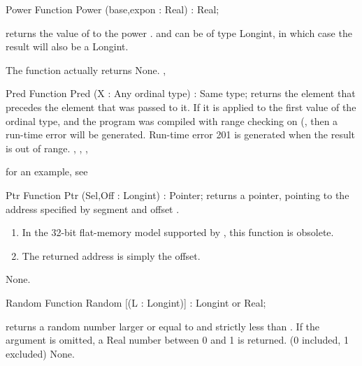 \begin{function}{Power}
\Declaration
Function Power (base,expon : Real) : Real;
\Description

 returns the value of  to the power .
 and  can be of type Longint, in which case the
result will also be a Longint.

The function actually returns 
\Errors
None.
\SeeAlso
{}, 
\end{function}


\begin{function}{Pred}
\Declaration
Function Pred (X : Any ordinal type) : Same type;
\Description
  returns the element that precedes the element that was passed
to it. If it is applied to the first value of the ordinal type, and the
program was compiled with range checking on (, then a run-time
error will be generated.
\Errors
Run-time error 201 is generated when the result is out of
range.
\SeeAlso
{}, , , 
\end{function}

for an example, see 

\begin{function}{Ptr}
\Declaration
Function Ptr (Sel,Off : Longint) : Pointer;
\Description
{} returns a pointer, pointing to the address specified by
segment  and offset .

 \begin{remark}
\begin{enumerate}
\item In the 32-bit flat-memory model supported by \fpc, this
function is obsolete.
\item The returned address is simply the offset.
\end{enumerate}
\end{remark}
\Errors
None.
\SeeAlso
{}
\end{function}


\begin{function}{Random}
\Declaration
Function Random [(L : Longint)] : Longint or Real;

\Description
{} returns a random number larger or equal to  and
strictly less than .
If the argument  is omitted, a Real number between 0 and 1 is returned.
(0 included, 1 excluded)
\Errors
None.
\SeeAlso
{}
\end{function}

